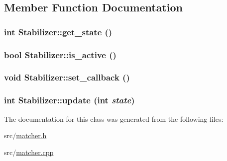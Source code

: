 \subsection{Member Function Documentation}
\hypertarget{class_stabilizer_ad0997d0f6d19288c0f00f1ec490b7efd}{
\subsubsection[{get\_\-state}]{\setlength{\rightskip}{0pt plus 5cm}int Stabilizer::get\_\-state ()}}
\label{class_stabilizer_ad0997d0f6d19288c0f00f1ec490b7efd}
\hypertarget{class_stabilizer_accffa026250013a4023fb2594bc74a31}{
\subsubsection[{is\_\-active}]{\setlength{\rightskip}{0pt plus 5cm}bool Stabilizer::is\_\-active ()}}
\label{class_stabilizer_accffa026250013a4023fb2594bc74a31}
\hypertarget{class_stabilizer_a07ef8a0a3c59271b0fe271af0807c6c2}{
\subsubsection[{set\_\-callback}]{\setlength{\rightskip}{0pt plus 5cm}void Stabilizer::set\_\-callback ()}}
\label{class_stabilizer_a07ef8a0a3c59271b0fe271af0807c6c2}
\hypertarget{class_stabilizer_af417ac1f22ed249d6dbd878a0d6e7907}{
\subsubsection[{update}]{\setlength{\rightskip}{0pt plus 5cm}int Stabilizer::update (int {\em state})}}
\label{class_stabilizer_af417ac1f22ed249d6dbd878a0d6e7907}


The documentation for this class was generated from the following files:\begin{DoxyCompactItemize}
\item 
src/\hyperlink{matcher_8h}{matcher.h}\item 
src/\hyperlink{matcher_8cpp}{matcher.cpp}\end{DoxyCompactItemize}
